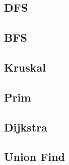 \subsection{DFS}
\subsection{BFS}
\subsection{Kruskal}
\subsection{Prim}
\subsection{Dijkstra}
\subsection{Union Find}
